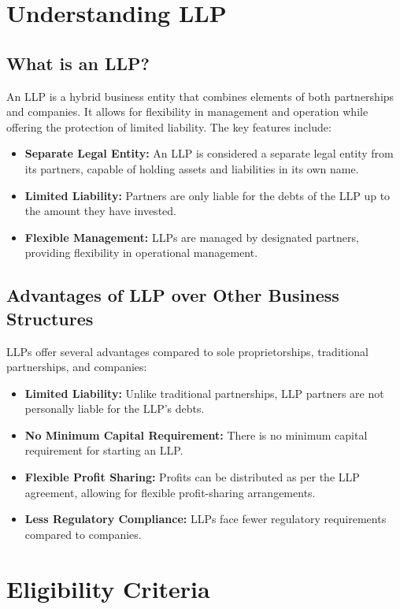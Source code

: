 \documentclass{article}
\begin{document}
\chapter{Understanding LLP}
\section{What is an LLP?}
An LLP is a hybrid business entity that combines elements of both partnerships and companies. It allows for flexibility in management and operation while offering the protection of limited liability. The key features include:
\begin{itemize}
    \item \textbf{Separate Legal Entity:} An LLP is considered a separate legal entity from its partners, capable of holding assets and liabilities in its own name.
    \item \textbf{Limited Liability:} Partners are only liable for the debts of the LLP up to the amount they have invested.
    \item \textbf{Flexible Management:} LLPs are managed by designated partners, providing flexibility in operational management.
\end{itemize}

\section{Advantages of LLP over Other Business Structures}
LLPs offer several advantages compared to sole proprietorships, traditional partnerships, and companies:
\begin{itemize}
    \item \textbf{Limited Liability:} Unlike traditional partnerships, LLP partners are not personally liable for the LLP's debts.
    \item \textbf{No Minimum Capital Requirement:} There is no minimum capital requirement for starting an LLP.
    \item \textbf{Flexible Profit Sharing:} Profits can be distributed as per the LLP agreement, allowing for flexible profit-sharing arrangements.
    \item \textbf{Less Regulatory Compliance:} LLPs face fewer regulatory requirements compared to companies.
\end{itemize}

\chapter{Eligibility Criteria}
\end{document}
